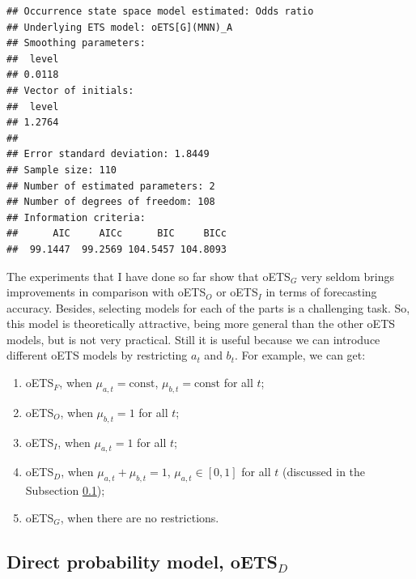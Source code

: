 \documentclass[]{book}
\providecommand{\tightlist}{%
  \setlength{\itemsep}{0pt}\setlength{\parskip}{0pt}}
\theoremstyle{definition}
\theoremstyle{definition}
\theoremstyle{definition}
\theoremstyle{definition}
\theoremstyle{remark}
\begin{document}
\begin{verbatim}
## Occurrence state space model estimated: Odds ratio
## Underlying ETS model: oETS[G](MNN)_A
## Smoothing parameters:
##  level 
## 0.0118 
## Vector of initials:
##  level 
## 1.2764 
## 
## Error standard deviation: 1.8449
## Sample size: 110
## Number of estimated parameters: 2
## Number of degrees of freedom: 108
## Information criteria: 
##      AIC     AICc      BIC     BICc 
##  99.1447  99.2569 104.5457 104.8093
\end{verbatim}

The experiments that I have done so far show that oETS\(_G\) very seldom brings improvements in comparison with oETS\(_O\) or oETS\(_I\) in terms of forecasting accuracy. Besides, selecting models for each of the parts is a challenging task. So, this model is theoretically attractive, being more general than the other oETS models, but is not very practical. Still it is useful because we can introduce different oETS models by restricting \(a_t\) and \(b_t\). For example, we can get:

\begin{enumerate}
\def\labelenumi{\arabic{enumi}.}
\tightlist
\item
  oETS\(_F\), when \(\mu_{a,t} = \text{const}\), \(\mu_{b,t} = \text{const}\) for all \(t\);
\item
  oETS\(_O\), when \(\mu_{b,t} = 1\) for all \(t\);
\item
  oETS\(_I\), when \(\mu_{a,t} = 1\) for all \(t\);
\item
  oETS\(_D\), when \(\mu_{a,t} + \mu_{b,t} = 1\), \(\mu_{a,t} \in [0,1]\) for all \(t\) (discussed in the Subsection \ref{oETSD});
\item
  oETS\(_G\), when there are no restrictions.
\end{enumerate}

\hypertarget{oETSD}{%
\subsection{\texorpdfstring{Direct probability model, oETS\(_D\)}{Direct probability model, oETS\_D}}\label{oETSD}}
\end{document}
